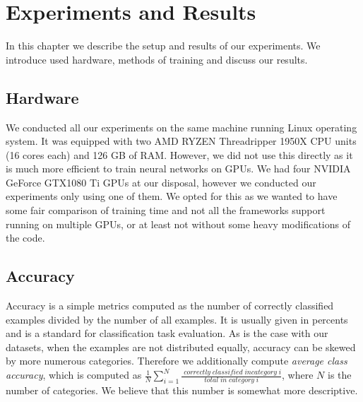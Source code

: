 \chapter{Experiments and Results}
\label{sec:chap5}
In this chapter we describe the setup and results of our experiments. We introduce used hardware, methods of training and discuss our results.

\section{Hardware}
We conducted all our experiments on the same machine running Linux operating system. It was equipped with two AMD RYZEN Threadripper 1950X CPU units (16 cores each) and 126 GB of RAM. However, we did not use this directly as it is much more efficient to train neural networks on GPUs. We had four NVIDIA GeForce GTX1080 Ti GPUs at our disposal, however we conducted our experiments only using one of them. We opted for this as we wanted to have some fair comparison of training time and not all the frameworks support running on multiple GPUs, or at least not without some heavy modifications of the code. 

\section{Accuracy}
Accuracy is a simple metrics computed as the number of correctly classified examples divided by the number of all examples. It is usually given in percents and is a standard for classification task evaluation. As is the case with our datasets, when the examples are not distributed equally, accuracy can be skewed by more numerous categories. Therefore we additionally compute \textit{average class accuracy}, which is computed as $\frac{1}{N}\sum_{i=1}^{N} {\frac{\;correctly\;classified\;in category\;i}{total\;in\;category\;i}} $, where $N$ is the number of categories. We believe that this number is somewhat more descriptive. 

